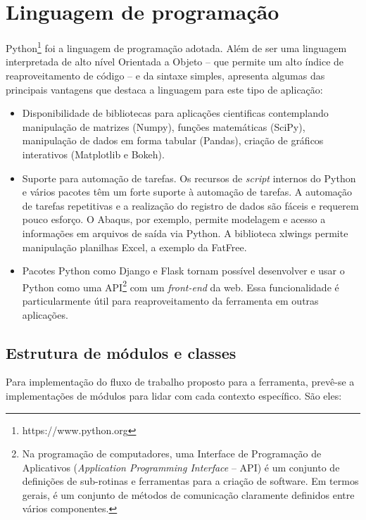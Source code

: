 \section{Linguagem de programação}

Python\footnote{https://www.python.org} foi a linguagem de programação adotada. Além de ser uma linguagem interpretada de alto nível Orientada a Objeto -- que permite um alto índice de reaproveitamento de código -- e da sintaxe simples,  apresenta algumas das principais vantagens que destaca a linguagem para este tipo de aplicação:

\begin{itemize}
    \item Disponibilidade de bibliotecas para aplicações cientificas contemplando manipulação de matrizes (Numpy), funções matemáticas (SciPy), manipulação de dados em forma tabular (Pandas), criação de gráficos interativos (Matplotlib e Bokeh).

    \item Suporte para automação de tarefas. Os recursos de \textit{script} internos do Python e vários pacotes têm um forte suporte à automação de tarefas. A automação de tarefas repetitivas e a realização do registro de dados são fáceis e requerem pouco esforço. O Abaqus, por exemplo, permite modelagem e acesso a informações em arquivos de saída via Python. A biblioteca xlwings permite manipulação planilhas Excel, a exemplo da FatFree.

    \item Pacotes Python como Django e Flask tornam possível desenvolver e usar o Python como uma API\footnote{Na programação de computadores, uma Interface de Programação de Aplicativos (\textit{Application Programming Interface} -- API) é um conjunto de definições de sub-rotinas e ferramentas para a criação de software. Em termos gerais, é um conjunto de métodos de comunicação claramente definidos entre vários componentes.} com um \textit{front-end} da web. Essa funcionalidade é particularmente útil para reaproveitamento da ferramenta em outras aplicações.
\end{itemize}

\subsection{Estrutura de módulos e classes}

Para implementação do fluxo de trabalho proposto para a ferramenta, prevê-se a implementações de módulos para lidar com cada contexto específico. São eles:

